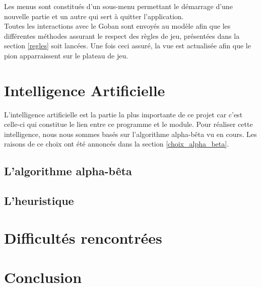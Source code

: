\documentclass[11pt,a4paper]{article}
\begin{document}
Les menus sont constitués d'un sous-menu permettant le démarrage d'une nouvelle
partie et un autre qui sert à quitter l'application.\\

Toutes les interactions avec le Goban sont envoyés au modèle afin que les
différentes méthodes assurant le respect des règles de jeu, présentées dans la
section \ref{regles} soit lancées. Une fois ceci assuré, la vue est
actualisée afin que le pion apparraissent sur le plateau de jeu.
\clearpage
\section{Intelligence Artificielle}
L'intelligence artificielle est la partie la plus importante de ce projet car
c'est celle-ci qui constitue le lien entre ce programme et le module.
Pour réaliser cette intelligence, nous nous sommes basés sur l'algorithme
alpha-bêta vu en cours. Les raisons de ce choix ont été annoncés dans la
section \ref{choix_alpha_beta}.

\subsection{L'algorithme alpha-bêta}

\subsection{L'heuristique}
\clearpage
\section{Difficultés rencontrées}

\clearpage
\section{Conclusion}
\end{document}
